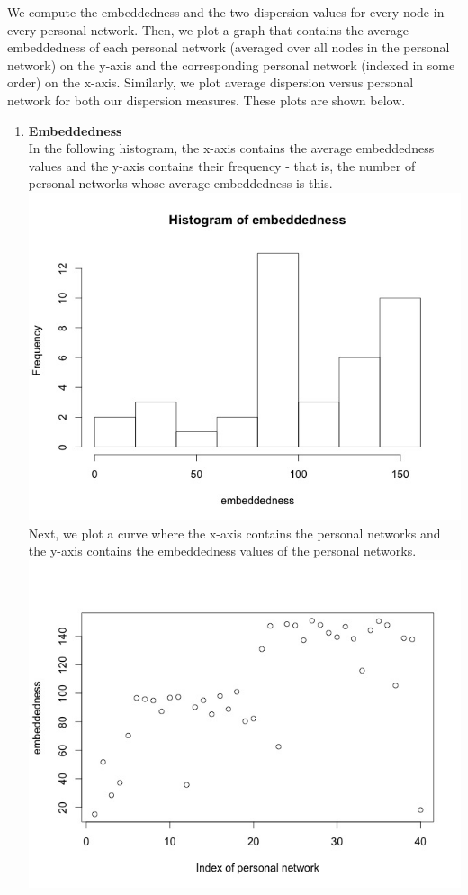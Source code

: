 \documentclass{article}
\begin{document}
We compute the embeddedness and the two dispersion values for every node in every personal network.
Then, we plot a graph that contains the average embeddedness of each personal network (averaged over all nodes in the personal network)
on the y-axis and the corresponding personal network (indexed in some order) on the x-axis. Similarly, we plot average dispersion versus
personal network for both our dispersion measures. These plots are shown below.\\

\begin{enumerate}
 \item \textbf{Embeddedness}\\
 In the following histogram, the x-axis contains the average embeddedness values and the y-axis contains their
 frequency - that is, the number of personal networks whose average embeddedness is this.\\
 \includegraphics[scale=0.4]{5-a} \\
 Next, we plot a curve where the x-axis contains the personal networks and the y-axis contains the embeddedness
 values of the personal networks.\\
 \includegraphics[scale=0.4]{5-b} \\
 

\end{enumerate}
\end{document}
